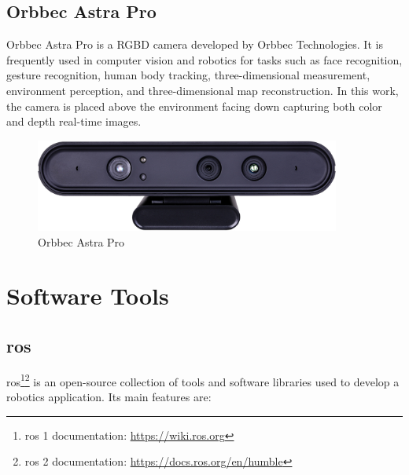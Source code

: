 \subsection{Orbbec Astra Pro}

Orbbec Astra Pro is a RGBD camera developed by Orbbec Technologies. It is frequently used in computer vision and robotics for tasks such as face recognition, gesture recognition, human body tracking, three-dimensional measurement, environment perception, and three-dimensional map reconstruction\cite{AstraPro}. In this work, the camera is placed above the environment facing down capturing both color and depth real-time images.

\begin{figure}[h]
\centerline{\includegraphics[height=1.2in]{figs/Astra.jpg}}
\caption[Orbbec Astra Pro]{Orbbec Astra Pro \cite{AstraPro}}
\label{fig:orbbec_astra_pro}
\end{figure}

\section{Software Tools}

\subsection{\acf{ros}}

\acs{ros}\cite{ROS2}\footnote{\acs{ros} 1 documentation: \url{https://wiki.ros.org}}\footnote{\acs{ros} 2 documentation: \url{https://docs.ros.org/en/humble}} is an open-source collection of tools and software libraries used to develop a robotics application. Its main features are:

